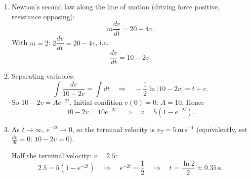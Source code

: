 \documentclass[11pt]{article}
\begin{document}
\begin{corrige}
\begin{enumerate}
\item Newton's second law along the line of motion (driving force positive, resistance opposing):
\[
m\frac{dv}{dt} = 20 - 4v.
\]
With $m = 2$: $2\dfrac{dv}{dt} = 20 - 4v$, i.e.
\[
\boxed{\frac{dv}{dt} = 10 - 2v}.
\]

\item Separating variables:
\[
\int \frac{dv}{10 - 2v} = \int dt
\quad\Longrightarrow\quad -\frac{1}{2}\ln|10 - 2v| = t + c.
\]
So $10 - 2v = Ae^{-2t}$. Initial condition $v(0) = 0$: $A = 10$. Hence
\[
10 - 2v = 10e^{-2t} \quad\Longrightarrow\quad \boxed{v = 5\left(1 - e^{-2t}\right)}.
\]

\item As $t \to \infty$, $e^{-2t} \to 0$, so the terminal velocity is $v_T = 5\ \mathrm{m\,s^{-1}}$ (equivalently, set $\frac{dv}{dt}=0$: $10 - 2v = 0$).

Half the terminal velocity: $v = 2.5$:
\[
2.5 = 5\left(1 - e^{-2t}\right) \quad\Longrightarrow\quad e^{-2t} = \frac{1}{2}
\quad\Longrightarrow\quad t = \frac{\ln 2}{2} \approx 0.35\ \mathrm{s}.
\]
\end{enumerate}
\end{corrige}
\end{document}

